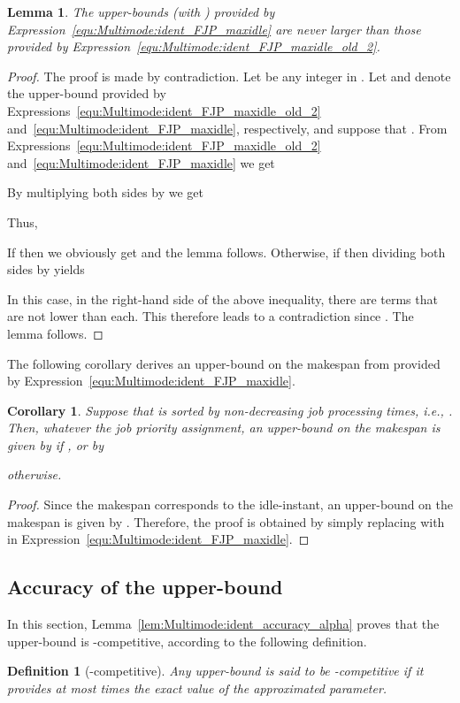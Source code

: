 \documentclass{article}
\newtheorem{Definition}{Definition}
\newtheorem{validity test}{Validity Test}
\newtheorem{Lemma}{Lemma}
\newtheorem{proof}{Proof}
\newtheorem{Corollary}{Corollary}
\begin{document}
\begin{Lemma}
\label{lem:Multimode:ident_FJP_maxidle_better}
The upper-bounds  (with ) provided by Expression~\ref{equ:Multimode:ident_FJP_maxidle} are never larger than those provided by Expression~\ref{equ:Multimode:ident_FJP_maxidle_old_2}.
\end{Lemma} 
\begin{proof}
The proof is made by contradiction. Let  be any integer in . Let  and  denote the upper-bound provided by Expressions~\ref{equ:Multimode:ident_FJP_maxidle_old_2} and~\ref{equ:Multimode:ident_FJP_maxidle}, respectively, and suppose that . From Expressions~\ref{equ:Multimode:ident_FJP_maxidle_old_2} and~\ref{equ:Multimode:ident_FJP_maxidle} we get


\noindent By multiplying both sides by  we get


\noindent Thus, 

\noindent If  then we obviously get  and the lemma follows. Otherwise, if  then dividing both sides by  yields

\noindent In this case, in the right-hand side of the above inequality, there are  terms that are not lower than  each. This therefore leads to a contradiction since . The lemma follows.
\end{proof}

The following corollary derives an upper-bound on the makespan from  provided by Expression~\ref{equ:Multimode:ident_FJP_maxidle}.

\begin{Corollary}
\label{cor:Multimode:ident_FJP_makespan}
Suppose that  is sorted by non-decreasing job processing times, i.e., . Then, whatever the job priority assignment, an upper-bound  on the makespan is given by  if , or by

otherwise.
\end{Corollary} 
\begin{proof}
Since the makespan corresponds to the  idle-instant, an upper-bound on the makespan is given by . Therefore, the proof is obtained by simply replacing  with  in Expression~\ref{equ:Multimode:ident_FJP_maxidle}.
\end{proof}

\subsection{Accuracy of the upper-bound }
\label{sec:FJP_Accuracy}

In this section, Lemma~\ref{lem:Multimode:ident_accuracy_alpha} proves that the upper-bound  is -competitive, according to the following definition. 
\begin{Definition}[-competitive]
Any upper-bound is said to be -competitive if it provides \emph{at most}  times the \emph{exact} value of the approximated parameter. 
\end{Definition}
\end{document}
